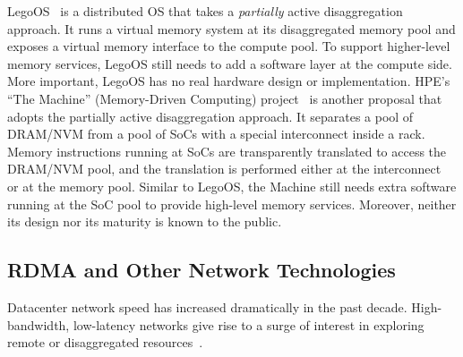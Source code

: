 LegoOS~\cite{Shan18-OSDI} is a distributed OS that takes a {\em partially} active disaggregation approach. 
It runs a virtual memory system at its disaggregated memory pool and exposes a virtual memory interface to the compute pool.
To support higher-level memory services, LegoOS still needs to add a software layer at the compute side.
More important, LegoOS has no real hardware design or implementation.
HPE's ``The Machine'' (Memory-Driven Computing) project~\cite{HP-TheMachine,THEMACHINE-HOTOS,HP-MODC-POSTER,THEMACHINE-WEB}
is another proposal that adopts the partially active disaggregation approach.
It separates a pool of DRAM/NVM from a pool of SoCs with a special interconnect inside a rack. %
Memory instructions running at SoCs are transparently translated to access the DRAM/NVM pool,
and the translation is performed either at the interconnect~\cite{Genz-citation} or at the memory pool.
Similar to LegoOS, the Machine still needs extra software running at the SoC pool to provide high-level memory services.
Moreover, neither its design nor its maturity is known to the public.

\subsection{RDMA and Other Network Technologies}
\label{sec:rdma}

Datacenter network speed has increased dramatically in the past decade.
High-bandwidth, low-latency networks give rise to a surge of interest in exploring remote or disaggregated 
resources~\cite{FaRM,FireBox-FASTKeynote,Shan18-OSDI,HP-TheMachine}.

